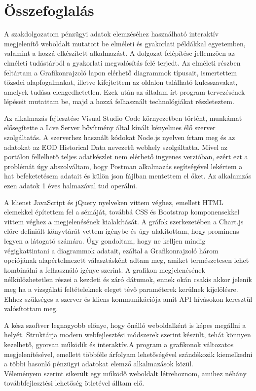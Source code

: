 
\section{Összefoglalás}

A szakdolgozatom pénzügyi adatok elemzéséhez használható interaktív megjelenítő weboldalt mutatott be elméleti és gyakorlati példákkal egyetemben, valamint a hozzá elkészített alkalmazást. A dolgozat felépítése jellemzően az elméleti tudástárból a gyakorlati megvalósítás felé terjedt. Az elméleti részben feltártam a Grafikonrajzoló lapon elérhető diagrammok típusait, ismertettem tőzsdei alapfogalmakat, illetve kifejtettem az oldalon található kulcsszavakat, amelyek tudása elengedhetetlen. Ezek után az általam írt program tervezésének lépéseit mutattam be, majd a hozzá felhasznált technológiákat részleteztem.

	Az alkalmazás fejlesztése Visual Studio Code környezetben történt, munkámat elősegítette a Live Server bővítmény által kínált kényelmes élő szerver szolgáltatás. A szerverhez használt kódokat Node.js nyelven írtam meg és az adatokat az EOD Historical Data nevezetű webhely szolgáltatta. Mivel az portálon fellelhető teljes adatkészlet nem elérhető ingyenes verzióban, ezért ezt a problémát úgy abszolváltam, hogy Postman alkalmazás segítségével lekértem a hat befeketetésem adatait és külön json fájlban mentettem el őket. Az alkalamzás ezen adatok 1 éves halmazával tud operálni. 

	A klienst JavaScript és jQuery nyelveken vittem véghez, emellett HTML elemekkel építettem fel a sémáját, továbbá CSS és Bootstrap komponensekkel vittem véghez a megjelenésének kialakítását. A gráfok szerkezetében a Chart.js előre definiált könyvtárát vettem igénybe és úgy alakítottam, hogy prominens legyen a látogató számára. Úgy gondoltam, hogy ne kelljen mindig végigkattintani a diagrammok adatait, ezáltal a Grafikonrajzoló három opciójának alapértelmezett választásként adtam meg, amiket természetesen lehet kombinálni a felhasználó igénye szerint. A grafikon megjelenésének nélkülözhetetlen részei a kezdeti és záró dátumok, ennek okán csakis akkor jelenik meg ha a vizsgálati feltételeknek eleget tévő paraméterek kerülnek kijelölésre. Ehhez szükséges a szerver és kliens kommunikációja amit API hívásokon keresztül valósítottam meg.

	A kész szoftver legnagyobb előnye, hogy önálló weboldalként is képes megállni a helyét. Struktárja modern webfejlesztési módszerek szerint készült, tehát könnyen kezelhető, gyorsan működik és interaktív.A program a grafikonok változatos megjelenítésével, emellett többféle árfolyam lehetőségével szándékozik kiemelkedni a többi hasonló pénzügyi adatokat elemző alkalmazások közül. \\
Véleményem szerint sikerült egy működő weboldalt létrehoznom, amihez néhány továbbfejlesztési lehetőség ötletével álltam elő.

